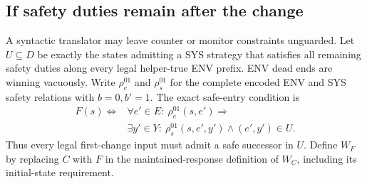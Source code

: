 \subsection{If safety duties remain after the change}
A syntactic translator may leave counter or monitor constraints unguarded.
Let $U\subseteq D$ be exactly the states admitting a SYS strategy that
satisfies all remaining safety duties along every legal helper-true ENV
prefix. ENV dead ends are winning vacuously. Write $\rho_e^{01}$ and
$\rho_s^{01}$ for the complete encoded ENV and SYS safety relations with
$b=0,b'=1$. The exact safe-entry condition is
\begin{equation}
\begin{aligned}
 F(s)\Longleftrightarrow{}&\forall e'\in E:\ \rho_e^{01}(s,e')\Rightarrow{}\\
 &\exists y'\in Y:\ \rho_s^{01}(s,e',y')\land(e',y')\in U.
\end{aligned}
\label{hpb:F}
\end{equation}
Thus every legal first-change input must admit a safe successor in $U$.
Define $W_F$ by replacing $C$ with $F$ in the maintained-response
definition of $W_C$, including its initial-state requirement.

